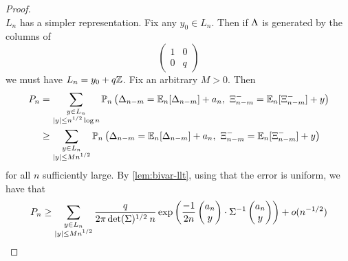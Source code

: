 \begin{proof}
\begin{equation*}
    \end{equation*}
    $L_n$ has a simpler representation. Fix any $y_0 \in L_n$. Then if $\Lambda$ is generated by the columns of
    \begin{equation*}
        \begin{pmatrix}
            1 & 0 \\
            0 & q
        \end{pmatrix}
    \end{equation*}
    we must have $L_n = y_0 + q{\mathbb Z}$. Fix an arbitrary $M > 0$. Then
    \begin{align*}
        P_n &= \sum_{\substack{y \in L_n \\ \abs{y} \leq n^{1/2} \log n}} \mathbb P_n \left( \Delta_{n-m} = \E_n[\Delta_{n-m}] + a_n, \ \Xi^-_{n-m} = \E_n[\Xi^-_{n-m}] + y \right) \\
        &\geq \sum_{\substack{y \in L_n \\ \abs{y} \leq M n^{1/2}}} \mathbb P_n \left( \Delta_{n-m} = \E_n[\Delta_{n-m}] + a_n, \ \Xi^-_{n-m} = \E_n[\Xi^-_{n-m}] + y \right)
    \end{align*}
    for all $n$ sufficiently large. By \cref{lem:bivar-llt}, using that the error is uniform, we have that
    \begin{equation*}
        P_n \geq \sum_{\substack{y \in L_n \\ \lvert y\rvert \leq M n^{1/2}}} 
         \frac{q}{2\pi \det(\Sigma)^{1/2} \: n} \exp\left( 
            \frac{-1}{2n} \begin{pmatrix} a_n \\ y \end{pmatrix} \cdot \Sigma^{-1} \begin{pmatrix} a_n \\ y \end{pmatrix}
         \right)
         + o( n^{-1/2} )
    \end{equation*}


\end{proof}
